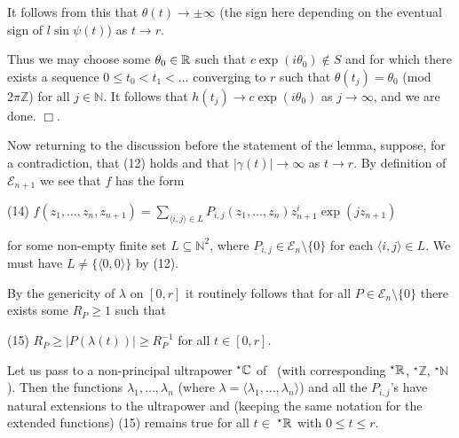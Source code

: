 \documentclass[12pt,nodate]{article}
\begin{document}
It follows from this that $\theta (t) \rightarrow \pm \infty$ (the sign here depending on the eventual sign of $l\sin \psi (t)$) as $t \rightarrow r$.

Thus we may choose some $\theta_0 \in \mathbb{R}$ such that $c \exp (i \theta_0 ) \notin S$ and for which there exists a sequence $0 \leq t_0 < t_1 < \ldots$ converging to $r$ such that $\theta (t_j) = \theta_0$ (mod $2\pi \mathbb{Z}$) for all $j \in \mathbb{N}$. It follows that $h(t_j ) \rightarrow c\exp (i\theta_0 )$ as $j \rightarrow \infty$, and we are done. $\Box$.

\vspace{3mm}

Now returning to the discussion before the statement of the lemma, suppose, for a contradiction, that (12) holds and that $|\gamma (t)| \rightarrow \infty$ as $t \rightarrow r$. By definition of $\mathcal{E}_{n+1}$ we see that $f$ has the form

\vspace{3mm}

\noindent
(14) \hspace{5mm} $f(z_1 , \ldots , z_n , z_{n+1} ) = \sum_{\langle i, j \rangle \in L} P_{i, j} (z_1 , \ldots , z_n ) z_{n+1}^i \exp (jz_{n+1})$

\vspace{3mm}

\noindent
for some non-empty finite set $L \subseteq \mathbb{N}^2$, where $P_{i, j} \in \mathcal{E}_n \setminus \{ 0 \}$ for each $\langle i, j \rangle \in L$. We must have $L \neq \{ \langle 0, 0 \rangle \}$ by (12).

By the genericity of $\lambda$ on $[0, r]$ it routinely follows that for all $P \in \mathcal{E}_n \setminus \{ 0 \}$ there exists some $R_P \geq 1$ such that

\vspace{3mm}

\noindent
(15) \hspace{10mm}  $R_P \geq |P(\lambda (t))| \geq R^{-1}_P$ for all $t \in [0, r]$.

\vspace{3mm}

Let us pass to a non-principal ultrapower $^{\star} \mathbb{C}$ of \C\  (with corresponding
 $^{\star}\mathbb{R}$, $^{\star}\mathbb{Z}$, $^{\star} \mathbb{N}$). Then the functions $\lambda_1 , \ldots , \lambda_n$ (where $\lambda = \langle \lambda_1 , \ldots , \lambda_n \rangle$) and all the $P_{i, j}$'s have natural extensions to the ultrapower and (keeping the same notation for the extended functions) (15) remains true for all $t \in$ $^{\star}\mathbb{R}$ with $0 \leq t \leq r$.
 
\end{document}
